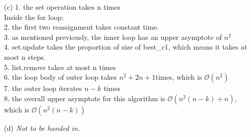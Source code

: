 \documentclass[11pt]{article}
\begin{document}
\begin{enumerate}
\begin{enumerate}
            \item[(c)]
            1. the set operation takes n times\\
            Inside the for loop:\\
            2. the first two reassignment takes constant time.\\
            3. as mentioned previously, the inner loop has an upper asymptote of $n^2$ \\
            4. set.update takes the proportion of size of best\_c1, which means it takes at most n steps.\\
            5. list.remove takes at most n times\\
            6. the loop body of outer loop takes $n^2 + 2n + 1$times, which is $\mathcal{O}(n^2)$\\
            7. the outer loop iterates $n-k$ times \\
            8. the overall upper asymptote for this algorithm is $\mathcal{O}(n^2(n-k)+n)$, which is $\mathcal{O}(n^2(n-k))$

            \item[(d)]
            \emph{Not to be handed in.}
        \end{enumerate}

    \end{enumerate}
\end{document}
